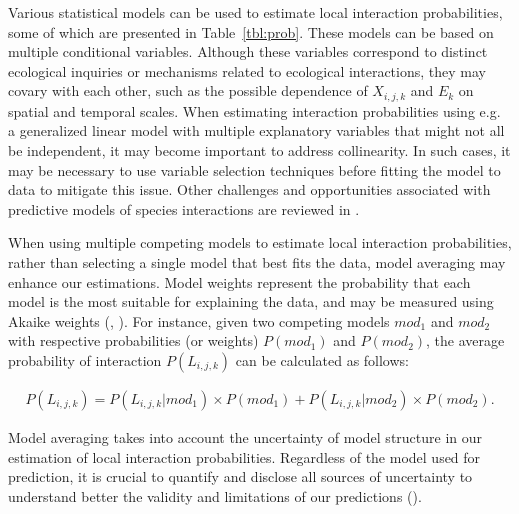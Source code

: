Various statistical models can be used to estimate local interaction
probabilities, some of which are presented in Table~\ref{tbl:prob}. These models can be
based on multiple conditional variables. Although these variables correspond to
distinct ecological inquiries or mechanisms related to ecological interactions,
they may covary with each other, such as the possible dependence of $X_{i,j,k}$
and $E_k$ on spatial and temporal scales. When estimating interaction
probabilities using e.g. a generalized linear model with multiple explanatory
variables that might not all be independent, it may become important to address
collinearity. In such cases, it may be necessary to use variable selection
techniques before fitting the model to data to mitigate this issue. Other
challenges and opportunities associated with predictive models of species
interactions are reviewed in \cite{Strydom2021Roadmapa}.

When using multiple competing models to estimate local interaction
probabilities, rather than selecting a single model that best fits the data,
model averaging may enhance our estimations. Model weights represent the
probability that each model is the most suitable for explaining the data, and
may be measured using Akaike weights (\cite{Burnham2004Multimodel},
\cite{Wagenmakers2004Aic}). For instance, given two competing models $mod_1$ and
$mod_2$ with respective probabilities (or weights) $P(mod_1)$ and $P(mod_2)$,
the average probability of interaction $P(L_{i, j, k})$ can be calculated as
follows: 

\begin{eqnarray}
  \label{eq:model_ens}
  P(L_{i, j, k}) = P(L_{i, j, k}|mod_1) \times P(mod_1)+ P(L_{i, j, k}|mod_2)
\times P(mod_2).
\end{eqnarray}

Model averaging takes into account the uncertainty of model structure in our
estimation of local interaction probabilities. Regardless of the model used for
prediction, it is crucial to quantify and disclose all sources of uncertainty to
understand better the validity and limitations of our predictions
(\cite{Simmonds2024Recommendations}).



